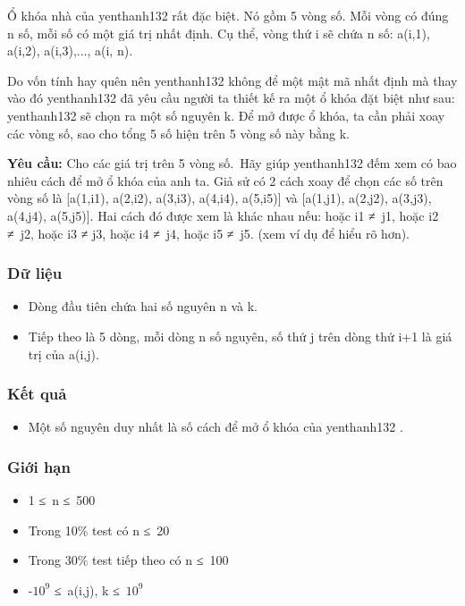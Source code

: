 

Ổ khóa nhà của yenthanh132 rất đặc biệt. Nó gồm 5 vòng số. Mỗi vòng có đúng n số, mỗi số có một giá trị nhất định. Cụ thể, vòng thứ i sẽ chứa n số: a(i,1), a(i,2), a(i,3),..., a(i, n).

Do vốn tính hay quên nên yenthanh132 không để một mật mã nhất định mà thay vào đó yenthanh132 đã yêu cầu người ta thiết kế ra một ổ khóa đặt biệt như sau: yenthanh132 sẽ chọn ra một số nguyên k. Để mở được ổ khóa, ta cần phải xoay các vòng số, sao cho tổng 5 số hiện trên 5 vòng số này bằng k.

\textbf{Yêu cầu: } Cho các giá trị trên 5 vòng số. Hãy giúp yenthanh132 đếm xem có bao nhiêu cách để mở ổ khóa của anh ta. Giả sử có 2 cách xoay để chọn các số trên vòng số là [a(1,i1), a(2,i2), a(3,i3), a(4,i4), a(5,i5)] và [a(1,j1), a(2,j2), a(3,j3), a(4,j4), a(5,j5)]. Hai cách đó được xem là khác nhau nếu: hoặc i1 ≠ j1, hoặc i2 ≠ j2, hoặc i3 ≠ j3, hoặc i4 ≠ j4, hoặc i5 ≠ j5. (xem ví dụ để hiểu rõ hơn).

\subsubsection{Dữ liệu}
\begin{itemize}
	\item Dòng đầu tiên chứa hai số nguyên n và k.
	\item Tiếp theo là 5 dòng, mỗi dòng n số nguyên, số thứ j trên dòng thứ i+1 là giá trị của a(i,j).
\end{itemize}

\subsubsection{Kết quả}
\begin{itemize}
	\item Một số nguyên duy nhất là số cách để mở ổ khóa của yenthanh132 .
\end{itemize}

\subsubsection{Giới hạn}
\begin{itemize}
	\item 1 ≤ n ≤ 500
	\item Trong 10\% test có n ≤ 20
	\item Trong 30\% test tiếp theo có n ≤ 100
	\item -$10^{9}$ ≤ a(i,j), k ≤ $10^{9}$
\end{itemize}

